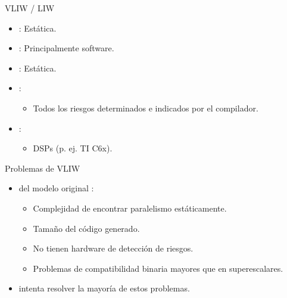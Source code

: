 \begin{frame}[t]{VLIW / LIW}
\begin{itemize}
  \item {}: Estática.
  \item {}: Principalmente software.
  \item {}: Estática.
  \item {}:
    \begin{itemize}
      \item Todos los riesgos determinados e indicados por el compilador.
    \end{itemize}
  
  \item {}: 
    \begin{itemize}
      \item DSPs (p. ej. TI C6x).
    \end{itemize}
\end{itemize}
\end{frame}

\begin{frame}[t]{Problemas de VLIW}
\begin{itemize}
  \item {} del modelo original :
    \begin{itemize}
      \item Complejidad de encontrar paralelismo estáticamente.
      \item Tamaño del código generado.
      \item No tienen hardware de detección de riesgos.
      \item Problemas de compatibilidad binaria mayores que en superescalares.
    \end{itemize}

  \item {} intenta resolver la mayoría de estos problemas.
\end{itemize}
\end{frame}

